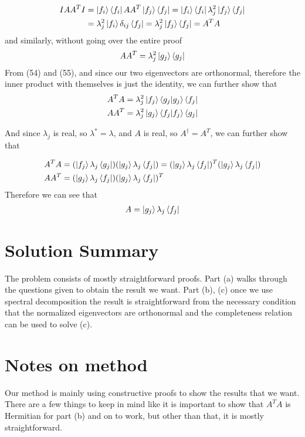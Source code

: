 \documentclass{article}
\begin{document}
\begin{align}
    IAA^TI &= \ket{f_i}\bra{f_i} AA^T \ket{f_j} \bra{f_j } = \ket{f_i}\bra{f_i} \lambda^2_j \ket{f_j} \bra{f_j } \\
    &=\lambda^2_j \ket{f_i} \delta_{ij} \bra{f_j} = \lambda^2_j \ket{f_j} \bra{f_j} = A^TA
\end{align}
and similarly, without going over the entire proof
\begin{align}
    AA^T = \lambda^2_j \ket{g_j} \bra{g_j}
\end{align}
From (54) and (55), and since our two eigenvectors are orthonormal, therefore the inner product with themselves is just the identity, we can further show that
\begin{align}
    A^T A &=\lambda_j^2 \ket{f_j} \bra{g_j} \ket{g_j} \bra{f_j} \\
    AA^T &=\lambda_j^2 \ket{g_j} \bra{f_j} \ket{f_j} \bra{g_j}
\end{align}

And since $\lambda_j$ is real, so $\lambda^* = \lambda$, and $A$ is real, so $A^\dagger = A^T$, we can further show that 

\begin{align}
    A^T A &= (\ket{f_j} \lambda_j \bra{g_j})(\ket{g_j} \lambda_j \bra{f_j}) = (\ket{g_j} \lambda_j \bra{f_j})^T (\ket{g_j} \lambda_j \bra{f_j}) \\
    AA^T &= (\ket{g_j} \lambda_j \bra{f_j})(\ket{g_j} \lambda_j \bra{f_j})^T
\end{align}
Therefore we can see that 
\begin{align}
    A = \ket{g_j} \lambda_j \bra{f_j}
\end{align}
\section{Solution Summary}

The problem consists of mostly straightforward proofs. Part (a) walks through the questions given to obtain the result we want. Part (b), (c) once we use spectral decomposition the result is straightforward from the necessary condition that the normalized eigenvectors are orthonormal and the completeness relation can be used to solve (c). 

\section{Notes on method}

Our method is mainly using constructive proofs to show the results that we want. There are a few things to keep in mind like it is important to show that $A^TA$ is Hermitian for part (b) and on to work, but other than that, it is mostly straightforward.
\end{document}
